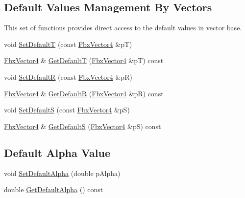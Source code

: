 \subsection*{Default Values Management By Vectors}
\label{_amgrp8b19443b68dbbe637da3ac6f0eb506c1}%
This set of functions provides direct access to the default values in vector base. \begin{DoxyCompactItemize}
\item 
void \hyperlink{class_fbx_texture_a6ae1a89cc64792069f8623e88463c0c2}{Set\+DefaultT} (const \hyperlink{class_fbx_vector4}{Fbx\+Vector4} \&pT)
\item 
\hyperlink{class_fbx_vector4}{Fbx\+Vector4} \& \hyperlink{class_fbx_texture_a21c9274acd1aaf5adec610777c1a2eeb}{Get\+DefaultT} (\hyperlink{class_fbx_vector4}{Fbx\+Vector4} \&pT) const
\item 
void \hyperlink{class_fbx_texture_a6c89d73fc05d96e1edea371476735bbb}{Set\+DefaultR} (const \hyperlink{class_fbx_vector4}{Fbx\+Vector4} \&pR)
\item 
\hyperlink{class_fbx_vector4}{Fbx\+Vector4} \& \hyperlink{class_fbx_texture_af87095172965d3d5b4da2a19101dbc19}{Get\+DefaultR} (\hyperlink{class_fbx_vector4}{Fbx\+Vector4} \&pR) const
\item 
void \hyperlink{class_fbx_texture_ae7a6ee36439e0117cdd3bc6e198df50c}{Set\+DefaultS} (const \hyperlink{class_fbx_vector4}{Fbx\+Vector4} \&pS)
\item 
\hyperlink{class_fbx_vector4}{Fbx\+Vector4} \& \hyperlink{class_fbx_texture_a19bf8d2e6b2cc8ae41391e895280b6f4}{Get\+DefaultS} (\hyperlink{class_fbx_vector4}{Fbx\+Vector4} \&pS) const
\end{DoxyCompactItemize}
\subsection*{Default Alpha Value}
\begin{DoxyCompactItemize}
\item 
void \hyperlink{class_fbx_texture_a7d415a77fda2ac6abb30f56b6caa932d}{Set\+Default\+Alpha} (double p\+Alpha)
\item 
double \hyperlink{class_fbx_texture_a7c240fc7ac0c884e736eda9c1be5dc4b}{Get\+Default\+Alpha} () const
\end{DoxyCompactItemize}
